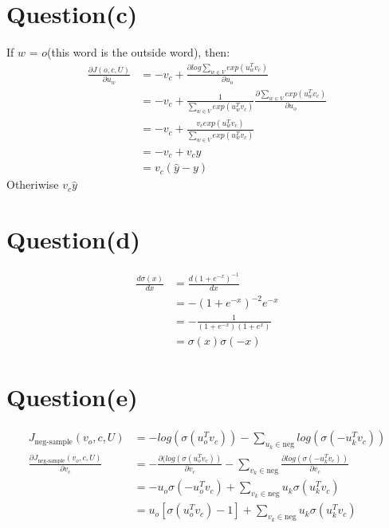 \documentclass[11pt]{article}
\begin{document}
\section{Question(c)}
If $w$ = $o$(this word is the outside word), then:
\begin{equation}
\begin{aligned}
\frac{\partial J(o, c, U)}{\partial u_w} &= -v_c + \frac{\partial log\sum_{w \in V} exp(u_w^Tv_c)}{\partial u_o} \\
&= -v_c + \frac{1}{\sum_{w \in V} exp(u_w^Tv_c)}\frac{\partial{\sum_{w \in V} exp(u_w^Tv_c)}}{\partial u_o}\\ 
&= -v_c + \frac{v_cexp(u_w^Tv_c)}{\sum_{w \in V} exp(u_w^Tv_c)}\\
&= -v_c + v_c\hat y\\
&= v_c(\hat y - y)
\end{aligned}
\end{equation}
Otheriwise $v_c\hat y$
\section{Question(d)}
\begin{equation}
\begin{aligned}
\frac{d\sigma(x)}{d x} &= \frac{d(1+e^{-x})^{-1}}{dx} \\
&= -(1+e^{-x})^{-2} e^{-x} \\
&= -\frac{1}{(1+e^{-x})(1+e^x)} \\
&= \sigma(x)\sigma(-x)
\end{aligned}
\end{equation}
\section{Question(e)}
\begin{equation}
\begin{aligned}
J_{\text{neg-sample}}(v_o, c, U) &= -log(\sigma(u_o^Tv_c)) - \sum_{u_k \in \text{neg}}log(\sigma(-u_k^Tv_c))\\
\frac{\partial J_{\text{neg-sample}}(v_o, c, U)}{\partial v_c} &= -\frac{\partial(log(\sigma(u_o^Tv_c))}{\partial v_c} - \sum_{v_k \in \text{neg}}\frac{\partial log(\sigma(-u_k^Tv_c))}{\partial v_c}\\
&= -u_o\sigma(-u_o^Tv_c) + \sum_{v_k \in \text{neg}}u_k\sigma(u_k^Tv_c)\\
&= u_o[\sigma(u_o^Tv_c)-1] + \sum_{v_k \in \text{neg}}u_k\sigma(u_k^Tv_c)
\end{aligned}
\end{equation} 
\end{document}

